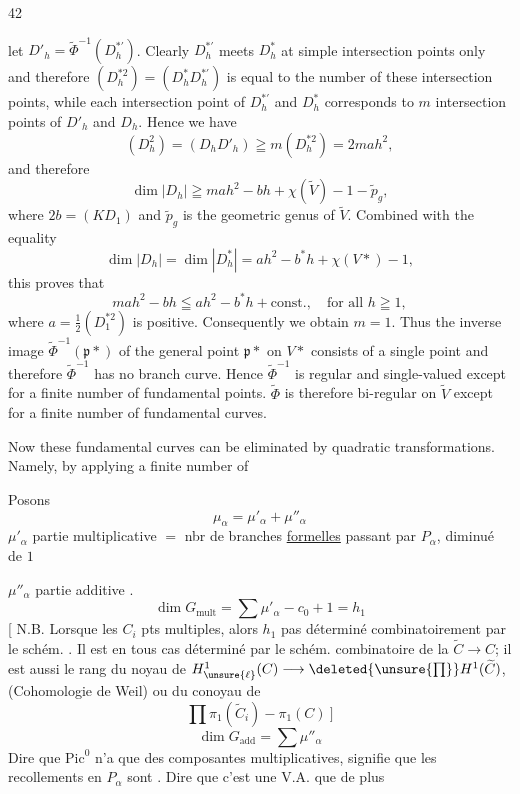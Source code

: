 \begin{center}42\end{center}
let $D'_h=\widetilde\Phi^{-1}(D_h^{*\prime})$. Clearly $D_h^{*\prime}$ meets $D_h^*$ at simple intersection points only and therefore $(D_h^{*2})=(D_h^*D_h^{*\prime})$ is equal to the number of these intersection points, while each intersection point of $D_h^{*\prime}$ and $D_h^*$ corresponds to $m$ intersection points of $D'_h$ and $D_h$. Hence we have
\[
(D_h^2)=(D_hD'_h)\geqq m(D_h^{*2})=2mah^2,
\]
and therefore
\[
\dim|D_h|\geqq mah^2-bh+\chi(\widetilde V)-1-\widetilde p_g,
\]
where $2b=(KD_1)$ and $\widetilde p_g$ is the geometric genus of $\widetilde V$. Combined with the equality
\[
\dim|D_h|=\dim|D_h^*|=ah^2-b^*h+\chi(V*)-1,
\]
this proves that
\[
mah^2-bh\leqq ah^2-b^*h+\text{const.},\quad\text{for all }h\geqq1,
\]
where $a=\frac12(D_1^{*2})$ is positive. Consequently we obtain $m=1$.
Thus the inverse image $\widetilde\Phi^{-1}(\mathfrak p*)$ of the general point $\mathfrak p*$ on $V*$ consists of a single point and therefore $\widetilde\Phi^{-1}$ has no branch curve. Hence $\widetilde\Phi^{-1}$ is regular and single-valued except for a finite number of fundamental points. $\widetilde\Phi$ is therefore bi-regular on $\widetilde V$ except for a finite number of fundamental curves.

Now these fundamental curves can be eliminated by quadratic transformations. Namely, by applying a finite number of

Posons
\[
\mu_\alpha=\mu'_\alpha+\mu''_\alpha
\]
$\mu'_\alpha$ partie multiplicative $=$ nbr de branches \uline{formelles} passant par $P_\alpha$, diminué de $1$

$\mu''_\alpha$ partie additive .
\[
\dim G_{\mathrm{mult}}=\sum\mu'_\alpha-c_0+1=h_1
\]
[ N.B. Lorsque les $C_i$  pts multiples, alors $h_1$  pas déterminé  combinatoirement par le schém.
. Il est en tous cas déterminé par le schém. combinatoire de la  $\widetilde C\longrightarrow C$; il est aussi le rang du \deleted{$\unsure{\Pi}$} noyau de
$H^1_{\unsure{\ell}}(C)\longrightarrow\deleted{\unsure{\prod}}H^1(\widetilde C)$, (Cohomologie de Weil) ou du conoyau de
\[
\prod\pi_1(\widetilde C_i)-\pi_1(C)\ ]
\]
\[
\dim G_{\mathrm{add}}=\sum\mu''_\alpha
\]
Dire que $\mathrm{Pic}^0$ n'a que des composantes  multiplicatives, signifie que les recollements en $P_\alpha$ sont .
Dire que c'est une V.A.   que  de plus

